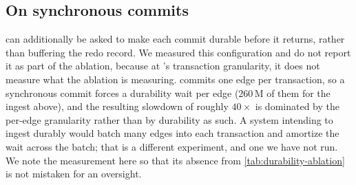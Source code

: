 \subsection{On synchronous commits}
\label{sec:eval:dynamic:durability:sync}

\wt{} can additionally be asked to make each commit durable before it returns, rather than buffering the redo record.
We measured this configuration and do not report it as part of the ablation, because at \project{}'s transaction granularity, it does not measure what the ablation is measuring.
\project{} commits one edge per transaction, so a synchronous commit forces a durability wait per edge ($260$\,M of them for the ingest above), and the resulting slowdown of roughly $40\times$ is dominated by the per-edge granularity rather than by durability as such.
A system intending to ingest durably would batch many edges into each transaction and amortize the wait across the batch; that is a different experiment, and one we have not run.
We note the measurement here so that its absence from \autoref{tab:durability-ablation} is not mistaken for an oversight.

%
%

